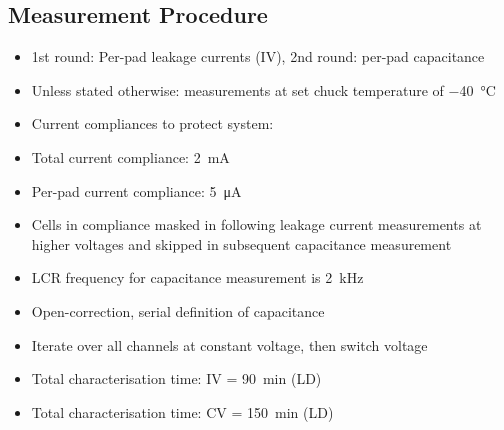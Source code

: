 \subsection{Measurement Procedure}
\label{subsec:setup_procedure}
\begin{itemize}
	\item 1st round: Per-pad leakage currents (IV), 2nd round: per-pad capacitance
	\item Unless stated otherwise: measurements at set chuck temperature of \SI{-40}{\celsius}
	\item Current compliances to protect system:
	\item Total current compliance: \SI{2}{\milli\ampere}
	\item Per-pad current compliance: \SI{5}{\micro\ampere}
	\item Cells in compliance masked in following leakage current measurements at higher voltages and skipped in subsequent capacitance measurement
	\item LCR frequency for capacitance measurement is \SI{2}{\kilo\hertz}
	\item Open-correction, serial definition of capacitance
	\item Iterate over all channels at constant voltage, then switch voltage
	\item Total characterisation time: IV = \SI{90}{\minute} (LD)
	\item Total characterisation time: CV = \SI{150}{\minute} (LD)

\end{itemize}
